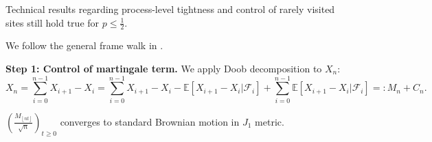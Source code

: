 
Technical results regarding process-level tightness and control of rarely visited sites still hold true for $p \le \frac{1}{2}$.

We follow the general frame walk in \cite{kosyginaFunctionalLimitLaws2016}. 

\textbf{Step 1: Control of martingale term.} We apply Doob decomposition to $X_n$:
\[
	X_n = \sum_{i = 0}^{n-1} X_{i+1}-X_i = \sum_{i = 0}^{n-1} X_{i+1}-X_i - \mathbb{E}\left[ X_{i+1} - X_i | \mathcal{F}_i \right] +  \sum_{i = 0}^{n-1} \mathbb{E}\left[ X_{i+1} - X_i | \mathcal{F}_i \right] =: M_n + C_n
.\] 

\begin{lemma}
	$\left(\frac{M_{\left\lfloor nt  \right\rfloor}}{\sqrt{n} }\right)_{t \ge 0}$ converges to standard Brownian motion in $J_1$ metric.
\end{lemma}
